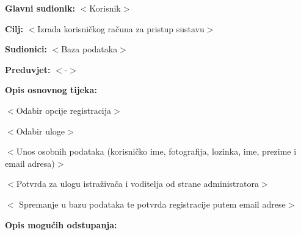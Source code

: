					\noindent {}
					\begin{packed_item}
						
						\item \textbf{Glavni sudionik: }$<$Korisnik$>$
						\item  \textbf{Cilj:} $<$Izrada korisničkog računa za pristup sustavu$>$
						\item  \textbf{Sudionici:} $<$Baza podataka$>$
						\item  \textbf{Preduvjet:} $<$-$>$
						\item  \textbf{Opis osnovnog tijeka:}
						
						\item[] \begin{packed_enum}
							
							\item $<$Odabir opcije registracija$>$
							\item $<$Odabir uloge$>$
							\item $<$Unos osobnih podataka (korisničko ime, fotografija, lozinka, ime, prezime i email adresa)$>$
							\item $<$Potvrda za ulogu istraživača i voditelja od strane administratora$>$
							\item $<$
							Spremanje u bazu podataka te potvrda registracije putem email adrese$>$
						
								\end{packed_enum}
						
					\end{packed_item}
					
					\item  \textbf{Opis mogućih odstupanja:}
					
